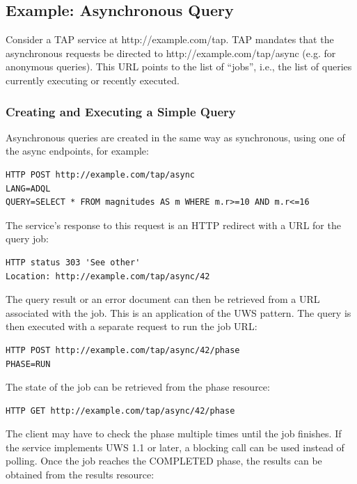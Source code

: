\documentclass[11pt,letter]{ivoa}
\begin{document}
\subsection{Example: Asynchronous Query}
Consider a TAP service at http://example.com/tap. TAP mandates that the 
asynchronous requests be directed to http://example.com/tap/async (e.g. for 
anonymous queries). This URL points to the list of ``jobs'', i.e., the list of 
queries currently executing or recently executed.

\subsubsection{Creating and Executing a Simple Query}

Asynchronous queries are created in the same way as synchronous, using 
one of the {async} endpoints, for example:

\begin{verbatim}
HTTP POST http://example.com/tap/async
LANG=ADQL
QUERY=SELECT * FROM magnitudes AS m WHERE m.r>=10 AND m.r<=16
\end{verbatim}

The service's response to this request is an HTTP redirect with a URL for the 
query job:

\begin{verbatim}
HTTP status 303 'See other'
Location: http://example.com/tap/async/42
\end{verbatim}

The query result or an error document can then be retrieved from a URL 
associated with the job. This is an application of the UWS pattern. The query is 
then executed with a separate request to run the job URL:

\begin{verbatim}
HTTP POST http://example.com/tap/async/42/phase
PHASE=RUN
\end{verbatim}

The state of the job can be retrieved from the phase resource:

\begin{verbatim}
HTTP GET http://example.com/tap/async/42/phase
\end{verbatim}

The client may have to check the phase multiple times until the job 
finishes. If the service implements UWS 1.1 \citep{2016ivoa.spec.1024H} or later, a blocking call
can be used instead of polling. Once the job reaches the COMPLETED phase, 
the results can be obtained from the results resource:
\end{document}
